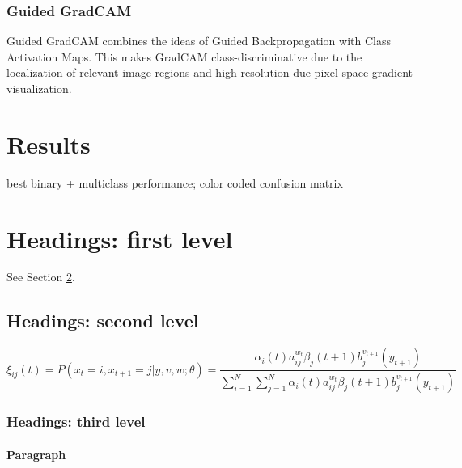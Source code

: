 \documentclass{article}
\begin{document}
\subsubsection{Guided GradCAM}
Guided GradCAM combines the ideas of Guided Backpropagation with Class Activation Maps.
This makes GradCAM class-discriminative due to the localization of relevant image regions and high-resolution due pixel-space gradient visualization.


\section{Results}
best binary + multiclass performance;
color coded confusion matrix

\section{Headings: first level}
\label{sec:headings}

\lipsum[4] See Section \ref{sec:headings}.

\subsection{Headings: second level}
\lipsum[5]
\begin{equation}
\xi _{ij}(t)=P(x_{t}=i,x_{t+1}=j|y,v,w;\theta)= {\frac {\alpha _{i}(t)a^{w_t}_{ij}\beta _{j}(t+1)b^{v_{t+1}}_{j}(y_{t+1})}{\sum _{i=1}^{N} \sum _{j=1}^{N} \alpha _{i}(t)a^{w_t}_{ij}\beta _{j}(t+1)b^{v_{t+1}}_{j}(y_{t+1})}}
\end{equation}

\subsubsection{Headings: third level}
\lipsum[6]

\paragraph{Paragraph}
\lipsum[7]
\end{document}
